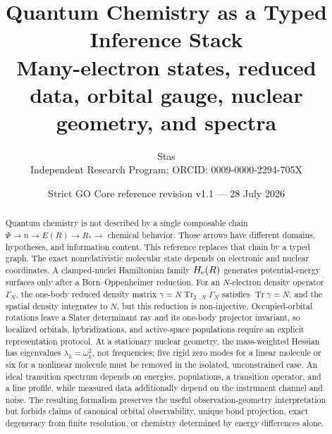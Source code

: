 \documentclass[11pt,a4paper]{article}
\title{\bfseries Quantum Chemistry as a Typed Inference Stack\\
\large Many-electron states, reduced data, orbital gauge, nuclear geometry, and spectra}
\author{Stas\\
\small Independent Research Program; ORCID: 0009-0000-2294-705X}
\date{Strict GO Core reference revision v1.1 --- 28 July 2026}
\theoremstyle{definition}
\theoremstyle{plain}
\theoremstyle{remark}
\newcommand{\Tr}{\operatorname{Tr}}
\begin{document}
\maketitle

\begin{center}
\end{center}

\begin{abstract}
Quantum chemistry is not described by a single composable chain
\(\Psi\to n\to E(R)\to R_\ast\to\) chemical behavior.  Those arrows
have different domains, hypotheses, and information content.  This
reference replaces that chain by a typed graph.  The exact
nonrelativistic molecular state depends on electronic and nuclear
coordinates.  A clamped-nuclei Hamiltonian family
\(H_{\rm e}(R)\) generates potential-energy surfaces only after a
Born--Oppenheimer reduction.  For an \(N\)-electron density operator
\(\Gamma_N\), the one-body reduced density matrix
\(\gamma=N\Tr_{2\ldots N}\Gamma_N\) satisfies
\(\Tr\gamma=N\), and the spatial density integrates to \(N\), but this
reduction is non-injective.  Occupied-orbital rotations leave a Slater
determinant ray and its one-body projector invariant, so localized
orbitals, hybridizations, and active-space populations require an
explicit representation protocol.  At a stationary nuclear geometry,
the mass-weighted Hessian has eigenvalues
\(\lambda_k=\omega_k^2\), not frequencies; five rigid zero modes for a
linear molecule or six for a nonlinear molecule must be removed in
the isolated, unconstrained case.  An ideal transition spectrum
depends on energies, populations, a transition operator, and a line
profile, while measured data additionally depend on the instrument
channel and noise.  The resulting formalism preserves the useful
observation-geometry interpretation but forbids claims of canonical
orbital observability, unique bond projection, exact degeneracy from
finite resolution, or chemistry determined by energy differences
alone.
\end{abstract}
\end{document}
